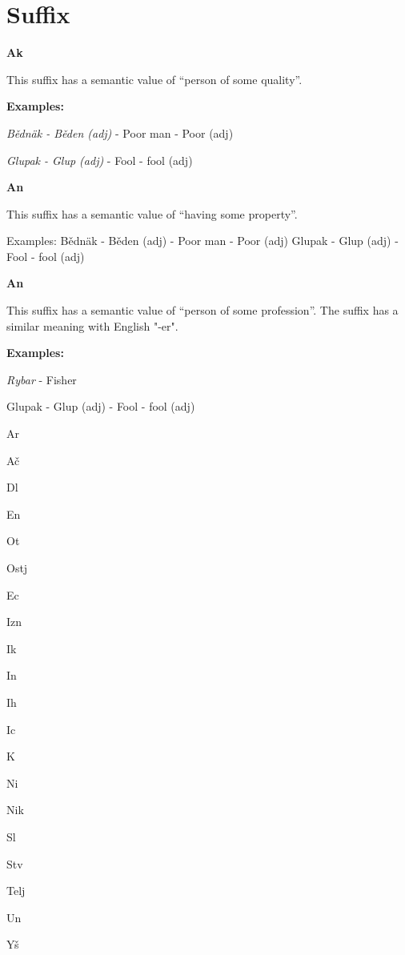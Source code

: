 \section{Suffix}


\textbf{Ak}

This suffix has a semantic value of “person of some quality”.

\textbf{Examples:}

\textit{Bědnäk - Běden (adj)} - Poor man - Poor (adj)

\textit{Glupak - Glup (adj)} - Fool - fool (adj)

\textbf{An}

This suffix has a semantic value of “having some property”.

Examples:
Bědnäk - Běden (adj) - Poor man - Poor (adj)
Glupak - Glup (adj) - Fool - fool (adj)

\textbf{An}

This suffix has a semantic value of “person of some profession”. The suffix has a similar meaning with English "-er".

\textbf{Examples:}

\textit{Rybar} - Fisher

Glupak - Glup (adj) - Fool - fool (adj)


Ar

Ač

Dl

En

Ot

Ostj

Ec

Izn

Ik

In

Ih

Ic

K

Ni

Nik

Sl

Stv

Telj

Un

Yš
